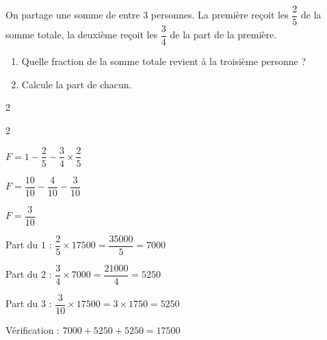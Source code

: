 \begin{exercice*}[Partage]
    On partage une somme de  entre $3$ personnes. La première reçoit les $\dfrac25$
    de la somme totale, la deuxième reçoit les $\dfrac34$ de la part de la première.
    \begin{enumerate}
        \item Quelle fraction de la somme totale revient à la troisième personne ?
        \item Calcule la part de chacun.
    \end{enumerate}
\end{exercice*}
\begin{corrige}
    \phantom{rrr}    
    \begin{multicols}2
        \begin{enumerate}
            \begin{spacing}2
            \item $F = 1-\dfrac{2}{5}-\dfrac{3}{4}\times \dfrac{2}{5}$
            
            $F = \dfrac{10}{10}-\dfrac{4}{10}-\dfrac{3}{10}$

            $F = \dfrac{3}{10}$
            \item Part du $1$ : $\dfrac{2}{5}\times \num{17500}=\dfrac{\num{35000}}{5}= \num{7000}$
            
            Part du $2$ : $\dfrac{3}{4}\times \num{7000}=\dfrac{\num{21000}}{4}= \num{5250}$

            Part du $3$ : $\dfrac{3}{10}\times \num{17500}=3\times \num{1750}= \num{5250}$

            Vérification : $\num{7000}+\num{5250}+\num{5250}=\num{17500}$
            \end{spacing}
        \end{enumerate}
    \end{multicols}
\end{corrige}


